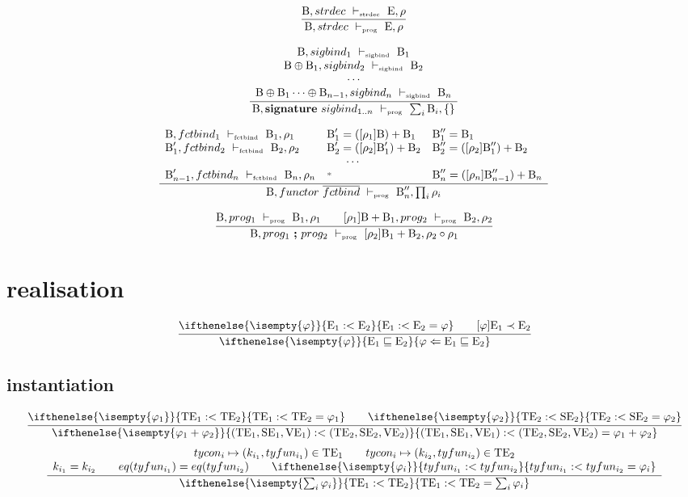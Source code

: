 \documentclass[11pt,a4paper]{article}
\newcommand{\key}[1]{\textrm{\textbf{#1}}}
\newcommand{\signature} {\key{signature}}
\newcommand{\B}  {\textrm{B}}
\newcommand{\E}  {\textrm{E}}
\newcommand{\TE} {\textrm{TE}}
\newcommand{\VE} {\textrm{VE}}
\newcommand{\SE} {\textrm{SE}}
\newcommand{\vdashSigBind} {\ \vdash_{\textrm{\tiny sigbind}}\ }
\newcommand{\vdashStrDec}	{\ \vdash_{\textrm{\tiny strdec}}\ }
\newcommand{\vdashFctBind} {\ \vdash_{\textrm{\tiny fctbind}}\ }
\newcommand{\vdashProg}	   {\ \vdash_{\textrm{\tiny prog}}\ }
\newcommand{\braced}[1]{\{#1\}}
\newcommand{\matchEnv}[3][]{ \ifthenelse{\isempty{#1}}{#2 \sqsubseteq #3}{#1 \Leftarrow #2 \sqsubseteq #3}}
\newcommand{\compose}[2]{#1 \circ #2}
\newcommand{\wildcard}{{\color{gray}\scriptstyle\textbf{*}}}
\newcommand{\Empty}{\braced{}}
\begin{document}
\[
\frac
 {\B, strdec \vdashStrDec \E,\rho}
 {\B, strdec \vdashProg \E,\rho}
\]

\[
\frac
 {\begin{array}{c}
  \B, sigbind_1 \vdashSigBind \B_1 \\
  \B \oplus \B_1, sigbind_2 \vdashSigBind \B_2 \\
  \cdots \\
  \B \oplus \B_1 \cdots \oplus \B_{n-1}, sigbind_n \vdashSigBind \B_n \\
  \end{array}}
 {\B, \signature\ sigbind_{1..n} \vdashProg \sum_i \B_i, \Empty}
\]

\[
\frac
 {\begin{array}{lll}
  \B      , fctbind_1 \vdashFctBind \B_1,\rho_1  & \B'_1 = ([\rho_1]\B)    + \B_1 & \B''_1 =                  \B_1\\
  \B'_1    , fctbind_2 \vdashFctBind \B_2,\rho_2 & \B'_2 = ([\rho_2]\B'_1) + \B_2 & \B''_2 = ([\rho_2]\B''_1)+\B_2\\
  \multicolumn{3}{c}{\cdots} \\
  \B'_{n-1}, fctbind_n \vdashFctBind \B_n,\rho_n & \wildcard & \B''_n= ([\rho_n]\B''_{n-1}) + \B_{n} \\
  \end{array}}
 {\B, functor\ \overline{fctbind} \vdashProg \B''_n, \prod_i\rho_i}
\]


\[
\cfrac
 {\B               , prog_1 \vdashProg \B_1,\rho_1 \qquad
  [\rho_1]\B + \B_1, prog_2 \vdashProg \B_2,\rho_2 }
 {\B, prog_1\ \key{;}\ prog_2 \vdashProg [\rho_2]\B_1 + \B_2, \compose{\rho_2}{\rho_1}}
\]

\section{realisation}
\vspace{-25pt}
\begin{flushright}
\framebox{ $ \matchEnv[\varphi]{\E_1}{\E_2} $ }
\end{flushright}

\newcommand{\instEop} {:<}
\newcommand{\instE}  [3][]{\ifthenelse{\isempty{#1}}{#2 \instEop #3}{#2 \instEop #3 = #1}}
\newcommand{\enrichE}[2]{#1 \prec #2}
\[
\cfrac
 {\instE[\varphi]{\E_1}{\E_2} \qquad \enrichE{[\varphi]\E_1}{\E_2} }
 {\matchEnv[\varphi]{\E_1}{\E_2}}
\]
\subsection{instantiation}
\[
\cfrac
 {\instE[\varphi_1]{\TE_1}{\TE_2} \qquad \instE[\varphi_2]{\TE_2}{\SE_2}}
 {\instE[\varphi_1 + \varphi_2]{(\TE_1,\SE_1,\VE_1)}{(\TE_2,\SE_2,\VE_2)}}
\]
\[
\cfrac
 {\begin{array}{c}
  tycon_i \mapsto (k_{i_1}, tyfun_{i_1}) \in \TE_1 \qquad tycon_i \mapsto (k_{i_2}, tyfun_{i_2}) \in \TE_2 \\
  k_{i_1} = k_{i_2} \qquad eq(tyfun_{i_1}) = eq(tyfun_{i_2}) \qquad \instE[\varphi_i]{tyfun_{i_1}}{tyfun_{i_2}} \\
  \end{array}}
 {\instE[\sum_i\varphi_i]{\TE_1}{\TE_2}}
\]
\end{document}
